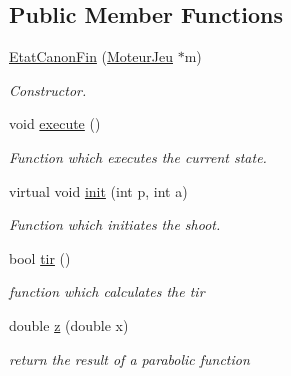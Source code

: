 \subsection*{Public Member Functions}
\begin{DoxyCompactItemize}
\item 
\hypertarget{class_etat_canon_fin_a93c11d6a5f7d469647cd7adbd8f0a83e}{
\hyperlink{class_etat_canon_fin_a93c11d6a5f7d469647cd7adbd8f0a83e}{EtatCanonFin} (\hyperlink{class_moteur_jeu}{MoteurJeu} $\ast$m)}
\label{class_etat_canon_fin_a93c11d6a5f7d469647cd7adbd8f0a83e}

\begin{DoxyCompactList}\small\item\em Constructor. \item\end{DoxyCompactList}\item 
\hypertarget{class_etat_canon_fin_afb4786bc286bb0bc26cd46c413043069}{
void \hyperlink{class_etat_canon_fin_afb4786bc286bb0bc26cd46c413043069}{execute} ()}
\label{class_etat_canon_fin_afb4786bc286bb0bc26cd46c413043069}

\begin{DoxyCompactList}\small\item\em Function which executes the current state. \item\end{DoxyCompactList}\item 
virtual void \hyperlink{class_etat_canon_fin_aac7f457072f1d159a897313390926a2d}{init} (int p, int a)
\begin{DoxyCompactList}\small\item\em Function which initiates the shoot. \item\end{DoxyCompactList}\item 
bool \hyperlink{class_etat_canon_fin_ac518ead16dbc90bc20aa44dc7126c6d6}{tir} ()
\begin{DoxyCompactList}\small\item\em function which calculates the tir \item\end{DoxyCompactList}\item 
double \hyperlink{class_etat_canon_fin_acb13afa9fd5ff6371060565844fbee4d}{z} (double x)
\begin{DoxyCompactList}\small\item\em return the result of a parabolic function \item\end{DoxyCompactList}\end{DoxyCompactItemize}


